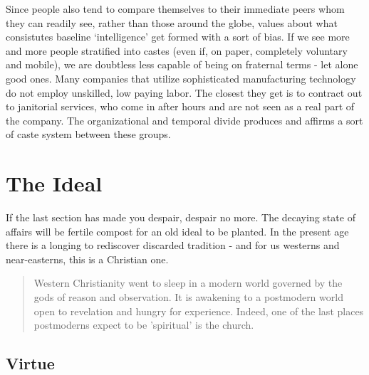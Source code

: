 \documentclass[letterpaper]{article}
\begin{document}
Since people also tend to compare themselves to their immediate peers whom they can readily see, rather than those around the globe, values about what consistutes baseline `intelligence' get formed with a sort of bias. If we see more and more people stratified into castes (even if, on paper, completely voluntary and mobile), we are doubtless less capable of being on fraternal terms - let alone good ones. Many companies that utilize sophisticated manufacturing technology do not employ unskilled, low paying labor. The closest they get is to contract out to janitorial services, who come in after hours and are not seen as a real part of the company. The organizational and temporal divide produces and affirms a sort of caste system between these groups.


\section{The Ideal}

If the last section has made you despair, despair no more. The decaying state of affairs will be fertile compost for an old ideal to be planted. In the present age there is a longing to rediscover discarded tradition - and for us westerns and near-easterns, this is a Christian one.

\begin{quote}
  Western Christianity went to sleep in a modern world governed by the gods of reason and observation. It is awakening to a postmodern world open to revelation and hungry for experience. Indeed, one of the last places postmoderns expect to be 'spiritual' is the church.
\end{quote}

\subsection{Virtue}
\end{document}
